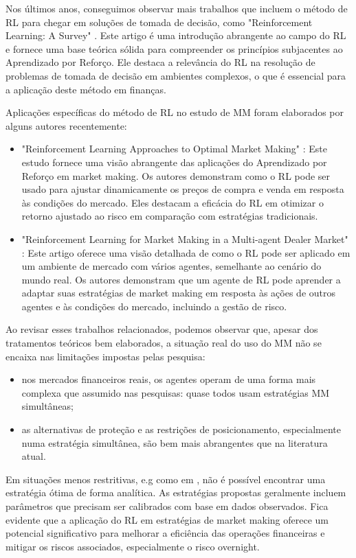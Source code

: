 Nos últimos anos, conseguimos observar mais trabalhos que incluem o método de RL para chegar em soluções de tomada de decisão, como "Reinforcement Learning: A Survey" \citep{Kaelbling1996}. Este artigo é uma introdução abrangente ao campo do RL e fornece uma base teórica sólida para compreender os princípios subjacentes ao Aprendizado por Reforço. Ele destaca a relevância do RL na resolução de problemas de tomada de decisão em ambientes complexos, o que é essencial para a aplicação deste método em finanças.

Aplicações específicas do método de RL no estudo de MM foram elaborados por alguns autores recentemente:
\begin{itemize}
    \item "Reinforcement Learning Approaches to Optimal Market Making" \citep{Gasperov2021}: Este estudo fornece uma visão abrangente das aplicações do Aprendizado por Reforço em market making. Os autores demonstram como o RL pode ser usado para ajustar dinamicamente os preços de compra e venda em resposta às condições do mercado. Eles destacam a eficácia do RL em otimizar o retorno ajustado ao risco em comparação com estratégias tradicionais.
    \item "Reinforcement Learning for Market Making in a Multi-agent Dealer Market" \citep{Ganesh2019}: Este artigo oferece uma visão detalhada de como o RL pode ser aplicado em um ambiente de mercado com vários agentes, semelhante ao cenário do mundo real. Os autores demonstram que um agente de RL pode aprender a adaptar suas estratégias de market making em resposta às ações de outros agentes e às condições do mercado, incluindo a gestão de risco.
\end{itemize}


Ao revisar esses trabalhos relacionados, podemos observar que, apesar dos tratamentos teóricos bem elaborados, a situação real do uso do MM não se encaixa nas limitações impostas pelas pesquisa:

\begin{itemize}
    \item nos mercados financeiros reais, os agentes operam de uma forma mais complexa que assumido nas pesquisas: quase todos usam estratégias MM simultâneas;
    \item as alternativas de proteção e as restrições de posicionamento, especialmente numa estratégia simultânea, são bem mais abrangentes que na literatura atual. 
\end{itemize}

Em situações menos restritivas, e.g como em \citet{Avellaneda2008}, não é possível encontrar uma estratégia ótima de forma analítica. As estratégias propostas geralmente incluem parâmetros que precisam ser calibrados com base em dados observados.
Fica evidente que a aplicação do RL em estratégias de market making oferece um potencial significativo para melhorar a eficiência das operações financeiras e mitigar os riscos associados, especialmente o risco overnight. 

